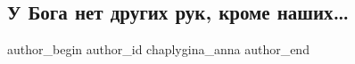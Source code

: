  
 
 
 
 

\subsection{У Бога нет других рук, кроме наших…}
\label{sec:24_04_2022.fb.chaplygina_anna.1.u_boga_net_drugikh_r}

\ifcmt
 author_begin
   author_id chaplygina_anna
 author_end
\fi
